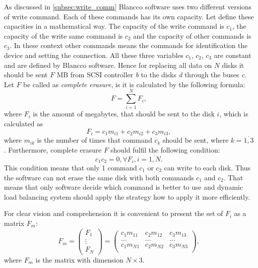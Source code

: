 As discussed in \ref{subsec:write_comm} Blancco software uses two different versions of write command. Each of these commands has its own capacity. Let define these capacities in a mathematical way.  The capacity of the write command is $c_1$, the capacity of the write same command is $c_2$ and the capacity of other commands is $c_3$. In these context other commands means the commands for identification the device and setting the connection. All these three variables $c_1$, $c_2$, $c_3$ are constant and are defined by Blancco software. Hence for replacing all data on $N$ disks it should be sent $F$ MB from SCSI controller \emph{b} to the disks \emph{d} through the buses \emph{c}. Let $F$ be called as \emph{complete erasure}, is it is calculated by the following formula:
\begin{equation}
\label{eq:comp_erasure}
	F = \sum_{i=1}^{N}F_i,
\end{equation}
where $F_i$ is the amount of megabytes, that should be sent to the disk $i$, which is calculated as
\begin{equation}
	F_i = c_1 m_{i1} + c_2 m_{i2} + c_3 m_{i3},
\end{equation}
where $m_{ik}$ is the number of times that command $c_k$ should be sent, where $k=\overline{1,3}$. Furthermore, complete erasure $F$ should fulfil the following condition:
\begin{equation}
\label{eq:write_cond}
	c_1 c_2 = 0, \forall F_i, i=\overline{1,N}.
\end{equation}
This condition means that only 1 command $c_1$ or $c_2$ can write to each disk. Thus the software can not erase the same disk with both commands $c_1$ and $c_2$. That means that only software decide which command is better to use and dynamic load balancing system should apply the strategy how to apply it more efficiently.


For clear vision and comprehension it is convenient to present the set of $F_i$ as a matrix $F_m$:
\begin{equation}
	F_m =
	\begin{pmatrix}
		F_1\\ \vdots\\ F_N 
	\end{pmatrix}
	=
	\begin{pmatrix}
		c_1 m_{11} & c_2 m_{12} & c_3 m_{13} \\
		\ldots & \ldots & \ldots \\
		c_1 m_{N1} & c_2 m_{N2} & c_3 m_{N3} \\
	\end{pmatrix},
\end{equation}
where $F_m$ is the matrix with dimension $N\times3$.


